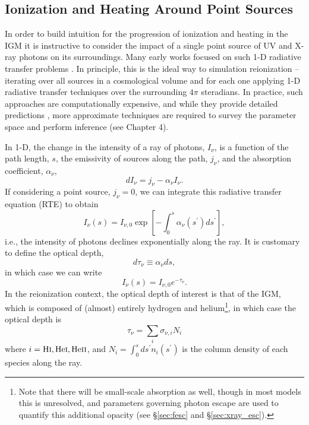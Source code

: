 \subsection{Ionization and Heating Around Point Sources} \label{sec:smallscales}
In order to build intuition for the progression of ionization and heating in the IGM it is instructive to consider the impact of a single point source of UV and X-ray photons on its surroundings. Many early works focused on such 1-D radiative transfer problems \cite{Zaroubi2007,Thomas2008}. In principle, this is the ideal way to simulation reionization -- iterating over all sources in a cosmological volume and for each one applying 1-D radiative transfer techniques over the surrounding $4\pi$ steradians. In practice, such approaches are computationally expensive, and while they provide detailed predictions \cite{OShea2015,Ocvirk2016,Gnedin2014}, more approximate techniques are required to survey the parameter space and perform inference (see Chapter 4).

In 1-D, the change in the intensity of a ray of photons, $I_{\nu}$, is a function of the path length, $s$, the emissivity of sources along the path, $j_{\nu}$, and the absorption coefficient, $\alpha_{\nu}$, 
\begin{equation}
	dI_{\nu} = j_{\nu} - \alpha_{\nu} I_{\nu} .
\end{equation}
If considering a point source, $j_{\nu} = 0$, we can integrate this radiative transfer equation (RTE) to obtain
\begin{equation}
	I_{\nu}(s) = I_{\nu,0} \exp\left[-\int_0^s \alpha_{\nu}(s^{\prime}) ds^{\prime} \right] ,
\end{equation}
i.e., the intensity of photons declines exponentially along the ray. It is customary to define the optical depth, 
\begin{equation}
	d\tau_{\nu} \equiv \alpha_{\nu} ds ,
\end{equation}
in which case we can write
\begin{equation}
	I_{\nu}(s) = I_{\nu,0} e^{-\tau_{\nu}} .
\end{equation}
In the reionization context, the optical depth of interest is that of the IGM, which is composed of (almost) entirely hydrogen and helium\footnote{Note that there will be small-scale absorption as well, though in most models this is unresolved, and parameters governing photon escape are used to quantify this additional opacity (see \S\ref{sec:fesc} and \S\ref{sec:xray_esc}).}, in which case the optical depth is 
\begin{equation}
	\tau_{\nu} = \sum_i \sigma_{\nu,i} N_i
\end{equation}
where $i=\text{H} {\textsc{i}},\text{He} {\textsc{i}},\text{He} {\textsc{ii}}$, and $N_i = \int_0^s ds^{\prime} n_i(s^{\prime})$ is the column density of each species along the ray.

